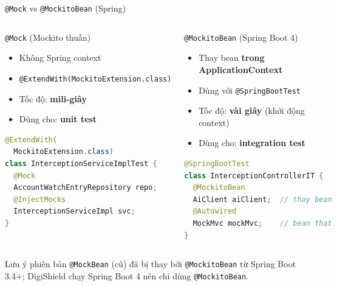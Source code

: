 \documentclass[aspectratio=169,12pt]{beamer}
\begin{document}
\begin{frame}{\texttt{@Mock} vs \texttt{@MockitoBean} (Spring)}
  \begin{columns}
    \begin{block}{\texttt{@Mock} (Mockito thuần)}
      \begin{itemize}\small
        \item Không Spring context
        \item \texttt{@ExtendWith(\allowbreak MockitoExtension.class)}
        \item Tốc độ: \textbf{mili-giây}
        \item Dùng cho: \textbf{unit test}
      \end{itemize}
\begin{lstlisting}[language=java,basicstyle=\ttfamily\scriptsize]
@ExtendWith(
  MockitoExtension.class)
class InterceptionServiceImplTest {
  @Mock
  AccountWatchEntryRepository repo;
  @InjectMocks
  InterceptionServiceImpl svc;
}
\end{lstlisting}
    \end{block}

    \begin{block}{\texttt{@MockitoBean} (Spring Boot 4)}
      \begin{itemize}\small
        \item Thay bean \textbf{trong ApplicationContext}
        \item Dùng với \texttt{@SpringBootTest}
        \item Tốc độ: \textbf{vài giây} (khởi động context)
        \item Dùng cho: \textbf{integration test}
      \end{itemize}
\begin{lstlisting}[language=java,basicstyle=\ttfamily\scriptsize]
@SpringBootTest
class InterceptionControllerIT {
  @MockitoBean
  AiClient aiClient;  // thay bean
  @Autowired
  MockMvc mockMvc;    // bean that
}
\end{lstlisting}
    \end{block}
  \end{columns}

  \begin{alertblock}{Lưu ý phiên bản}
    \texttt{@MockBean} (cũ) đã bị thay bởi \texttt{@MockitoBean} từ Spring Boot 3.4+;
    DigiShield chạy Spring Boot 4 nên chỉ dùng \texttt{@MockitoBean}.
  \end{alertblock}
\end{frame}
\end{document}
